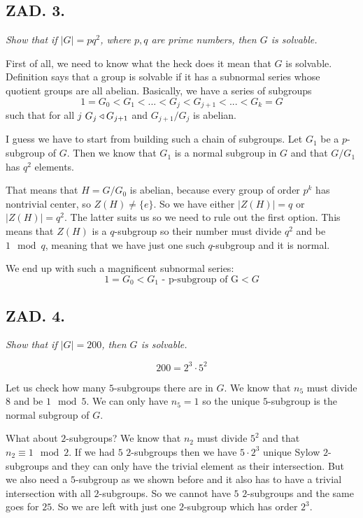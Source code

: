 \documentclass{article}[13pt]
\begin{document}
\subsection*{ZAD. 3.}

\emph{Show that if $|G|=pq^2$, where $p,q$ are prime numbers, then $G$ is solvable.}
\medskip

First of all, we need to know what the heck does it mean that $G$ is solvable. Definition says that a group is solvable if it has a {\color{def}subnormal series whose quotient groups are all abelian}. Basically, we have a series of subgroups
$$1=G_0<G_1<...<G_j<G_{j+1}<...<G_k=G$$
such that for all $j$ $G_j\triangleleft G_{j+1}$ and $G_{j+1}/G_j$ is abelian.

\medskip

\medskip

I guess we have to start from building such a chain of subgroups. Let $G_1$ be a $p$-subgroup of $G$. Then we know that $G_1$ is a normal subgroup in $G$ and that $G/G_1$ has $q^2$ elements. 
\smallskip

That means that $H=G/G_0$ is abelian, because every group of order $p^k$ has nontrivial center, so $Z(H)\neq\{e\}$. So we have either $|Z(H)|=q$ or $|Z(H)|=q^2$. The latter suits us so we need to rule out the first option. This means that $Z(H)$ is a $q$-subgroup so their number must divide $q^2$ and be $1\mod q$, meaning that we have just one such $q$-subgroup and it is normal.
\smallskip

We end up with such a magnificent subnormal series:
$$1=G_0<G_1\text{ - p-subgroup of G}<G$$

\subsection*{ZAD. 4.}

\emph{Show that if $|G|=200$, then $G$ is solvable.}
\medskip

$$200=2^3\cdot5^2$$

Let us check how many $5$-subgroups there are in $G$. We know that $n_5$ must divide $8$ and be $1\mod 5$. We can only have $n_5=1$ so the unique $5$-subgroup is the normal subgroup of $G$.
\smallskip

What about $2$-subgroups? We know that $n_2$ must divide $5^2$ and that $n_2\equiv 1\mod2$. If we had $5$ $2$-subgroups then we have $5\cdot 2^3$ unique Sylow $2$-subgroups and they can only have the trivial element as their intersection. But we also need a $5$-subgroup as we shown before and it also has to have a trivial intersection with all $2$-subgroups. So we cannot have $5$ $2$-subgroups and the same goes for $25$. So we are left with just one $2$-subgroup which has order $2^3$.
\smallskip
\end{document}
